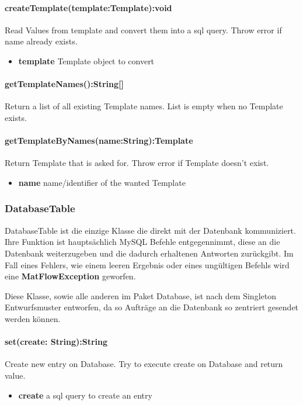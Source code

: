\paragraph{createTemplate(template:Template):void}
Read Values from template and convert them into a sql query.
Throw error if name already exists.
\begin{itemize}
	\item \textbf{template}
	Template object to convert
\end{itemize}

\paragraph{getTemplateNames():String[]}
Return a list of all existing Template names.
List is empty when no Template exists.

\paragraph{getTemplateByNames(name:String):Template}
Return Template that is asked for.
Throw error if Template doesn't exist.
\begin{itemize}
	\item \textbf{name}
	name/identifier of the wanted Template
\end{itemize}



\subsubsection{DatabaseTable}
DatabaseTable ist die einzige Klasse die direkt mit der Datenbank kommuniziert. Ihre Funktion ist hauptsächlich MySQL Befehle entgegennimmt, diese an die Datenbank weiterzugeben und die dadurch erhaltenen Antworten zurückgibt. Im Fall eines Fehlers, wie einem leeren Ergebnis oder eines ungültigen Befehls wird eine \textbf{MatFlowException} geworfen.

Diese Klasse, sowie alle anderen im Paket Database, ist nach dem Singleton Entwurfsmuster entworfen, da so Aufträge an die Datenbank so zentriert gesendet werden können.

\paragraph{set(create: String):String} Create new entry on Database. Try to execute create on Database and return value.
\begin{itemize}
	\item \textbf{create} 
	a sql query to create an entry
\end{itemize}


